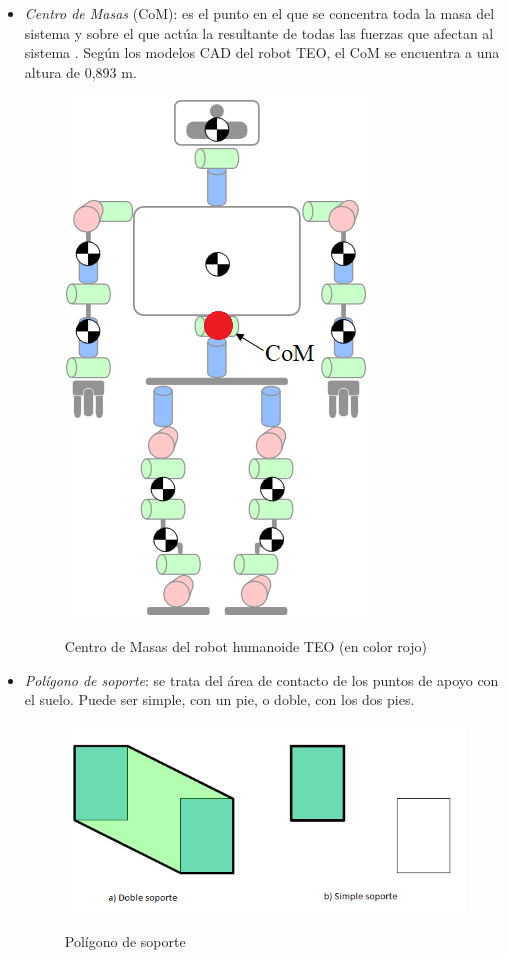 \begin{itemize}
\item \emph{Centro de Masas} (CoM): es el punto en el que se concentra toda la masa del sistema y sobre el que actúa la resultante de todas las fuerzas que afectan al sistema \cite{ref9}. Según los modelos CAD del robot TEO, el CoM se encuentra a una altura de 0,893 m.

\begin{figure}[H]
\centering
{\includegraphics[scale=0.5]{imagenes/apartado_2/215_center_of_mass}}
\caption{Centro de Masas del robot humanoide TEO (en color rojo)}
\label{figura215}
\end{figure}

\item \emph{Polígono de soporte}: se trata del área de contacto de los puntos de apoyo con el suelo. Puede ser simple, con un pie, o doble, con los dos pies.

\begin{figure}[H]
\centering
{\includegraphics[scale=0.6]{imagenes/apartado_2/216_supportpolygon}}
\caption{Polígono de soporte}
\label{figura216}
\end{figure}


\end{itemize}
